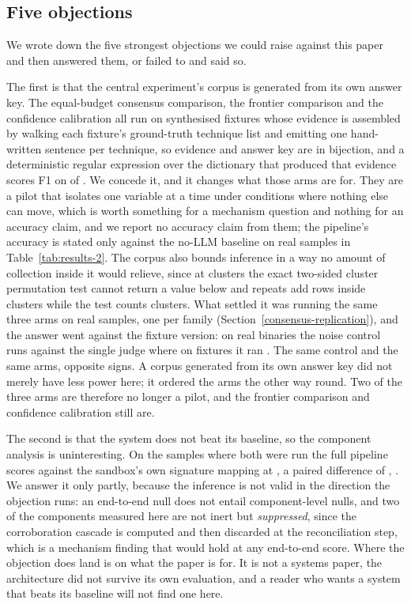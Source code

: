 \subsection{Five objections}\label{objections}

We wrote down the five strongest objections we could raise against this paper and then answered
them, or failed to and said so.

The first is that the central experiment's corpus is generated from its own answer key. The
equal-budget consensus comparison, the frontier comparison and the confidence calibration all run on
 synthesised fixtures whose evidence is assembled by walking each fixture's
ground-truth technique list and emitting one hand-written sentence per technique, so evidence and
answer key are in bijection, and a deterministic regular expression over the dictionary that
produced that evidence scores F1  on  of
. We concede it, and it changes what those arms are for. They are a pilot
that isolates one variable at a time under conditions where nothing else can move, which is worth
something for a mechanism question and nothing for an accuracy claim, and we report no accuracy
claim from them; the pipeline's accuracy is stated only against the no-LLM baseline on real samples
in Table~\ref{tab:results-2}. The corpus also bounds inference in a way no amount of collection
inside it would relieve, since at  clusters the exact two-sided cluster
permutation test cannot return a value below  and repeats add rows
inside clusters while the test counts clusters. What settled it was running the same three arms on
 real samples, one per family
(Section~\ref{consensus-replication}), and the answer went against the fixture version: on real
binaries the noise control runs  against the single judge where on fixtures it
ran . The same control and the same arms, opposite signs. A corpus
generated from its own answer key did not merely have less power here; it ordered the arms the other
way round. Two of the three arms are therefore no longer a pilot, and the frontier comparison and
confidence calibration still are.

The second is that the system does not beat its baseline, so the component analysis is
uninteresting. On the samples where both were run the full pipeline scores 
against the sandbox's own signature mapping at , a paired difference of
, . We answer it only partly, because the inference is not valid in the
direction the objection runs: an end-to-end null does not entail component-level nulls, and two of
the components measured here are not inert but \emph{suppressed}, since the corroboration cascade is
computed and then discarded at the reconciliation step, which is a mechanism finding that would hold
at any end-to-end score. Where the objection does land is on what the paper is for. It is not a
systems paper, the architecture did not survive its own evaluation, and a reader who wants a system
that beats its baseline will not find one here.

